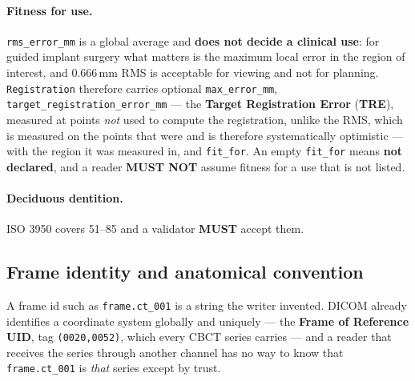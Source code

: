 \documentclass[11pt,a4paper]{article}
\newcommand{\MUST}{\textcolor{uosred}{\textbf{MUST}}}
\newcommand{\MUSTNOT}{\textcolor{uosred}{\textbf{MUST NOT}}}
\newcommand{\code}[1]{\texttt{\small #1}}
\begin{document}
\paragraph{Fitness for use.} \code{rms\_error\_mm} is a global average and \textbf{does not
decide a clinical use}: for guided implant surgery what matters is the maximum local error
in the region of interest, and 0.666\,mm RMS is acceptable for viewing and not for
planning. \code{Registration} therefore carries optional \code{max\_error\_mm},
\code{target\_registration\_error\_mm} --- the \textbf{Target Registration Error}
(\textbf{TRE}), measured at points \emph{not} used to compute
the registration, unlike the RMS, which is measured on the points that were and is
therefore systematically optimistic --- with the region it was measured in, and
\code{fit\_for}. An empty \code{fit\_for} means \textbf{not declared}, and a reader
\MUSTNOT{} assume fitness for a use that is not listed.

\paragraph{Deciduous dentition.} ISO 3950 covers 51--85 and a validator \MUST{} accept
them.

\subsection{Frame identity and anatomical convention}\label{sec:frameid}

A frame id such as \code{frame.ct\_001} is a string the writer invented. DICOM already
identifies a coordinate system globally and uniquely --- the
\textbf{Frame of Reference UID}, tag \code{(0020,0052)}, which every CBCT series carries --- and a reader that
receives the series through another channel has no way to know that \code{frame.ct\_001}
is \emph{that} series except by trust.
\end{document}
